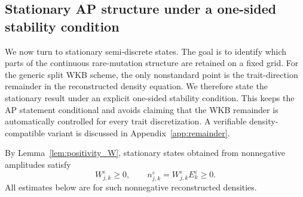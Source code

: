 \documentclass[11pt]{article}
\newtheorem{remark}{Remark}[section]
\begin{document}



\subsection{Stationary AP structure under a one-sided stability condition}
\label{subsec:stationary_discrete_AP}

We now turn to stationary semi-discrete states. The goal is to identify which
parts of the continuous rare-mutation structure are retained on a fixed grid.
For the generic split WKB scheme, the only nonstandard point is the
trait-direction remainder in the reconstructed density equation. We therefore
state the stationary result under an explicit one-sided stability condition.
This keeps the AP statement conditional and avoids claiming that the WKB
remainder is automatically controlled for every trait discretization. A
verifiable density-compatible variant is discussed in
Appendix~\ref{app:remainder}.

By Lemma~\ref{lem:positivity_W}, stationary states obtained from nonnegative
amplitudes satisfy
\[
    W_{j,k}^\varepsilon\ge0,
    \qquad
    n_{j,k}^\varepsilon
    =W_{j,k}^\varepsilon E_k^\varepsilon\ge0 .
\]
All estimates below are for such nonnegative reconstructed densities.
\end{document}
